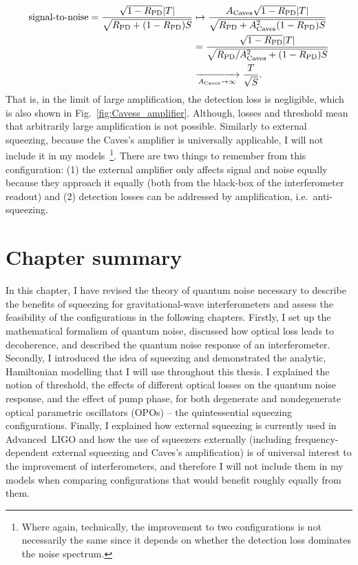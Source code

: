 \begin{align}\text{signal-to-noise} = \frac{\sqrt{1-R_\text{PD}}\abs{T}}{\sqrt{R_\text{PD}+(1-R_\text{PD})S}}&\mapsto\frac{A_\text{Caves}\sqrt{1-R_\text{PD}}\abs{T}}{\sqrt{R_\text{PD}+A_\text{Caves}^2(1-R_\text{PD})S}}\\
&=\frac{\sqrt{1-R_\text{PD}}\abs{T}}{\sqrt{R_\text{PD}/A_\text{Caves}^2+(1-R_\text{PD})S}}\\
&\xrightarrow[A_\text{Caves}\rightarrow\infty]{} \frac{T}{\sqrt S}.
\end{align}
That is, in the limit of large amplification, the detection loss is negligible, which is also shown in Fig.~\ref{fig:Cavess_amplifier}. Although, losses and threshold mean that arbitrarily large amplification is not possible.  Similarly to external squeezing, because the Caves's amplifier is universally applicable, I will not include it in my models~\footnote{Where again, technically, the improvement to two configurations is not necessarily the same since it depends on whether the detection loss dominates the noise spectrum.}. There are two things to remember from this configuration: (1) the external amplifier only affects signal and noise equally because they approach it equally (both from the black-box  of the interferometer readout) and (2) detection losses can be addressed by amplification, i.e.\ anti-squeezing.


\section{Chapter summary}

In this chapter, I have revised the theory of quantum noise necessary to describe the benefits of squeezing for gravitational-wave interferometers and assess the feasibility of the configurations in the following chapters. Firstly, I set up the mathematical formalism of quantum noise, discussed how optical loss leads to decoherence, and described the quantum noise response of an interferometer. Secondly, I introduced the idea of squeezing and demonstrated the analytic, Hamiltonian modelling that I will use throughout this thesis. I explained the notion of threshold, the effects of different optical losses on the quantum noise response, and the effect of pump phase, for both degenerate and nondegenerate optical parametric oscillators (OPOs) -- the quintessential squeezing configurations. Finally, I explained how external squeezing is currently used in Advanced~LIGO and how the use of squeezers externally (including frequency-dependent external squeezing and Caves's amplification) is of universal interest to the improvement of interferometers, and therefore I will not include them in my models when comparing configurations that would benefit roughly equally from them. %


